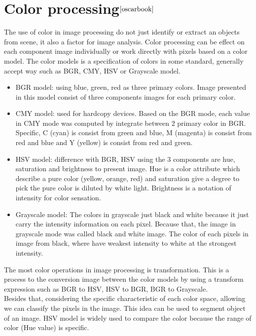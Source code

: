 \section{Color processing$^{\cite{oscarbook}}$}\label{color_model}
The use of color in image processing do not just identify or extract an objects from scene, it also a factor for image analysis. Color processing can be effect on each component image individually or work directly with pixels based on a color model. The color models is a specification of colors in some standard, generally accept way such as BGR, CMY, HSV or Grayscale model.
\begin{itemize}
\item BGR model: using blue, green, red as three primary colors. Image presented in this model consist of three components images for each primary color.
\item CMY model: used for hardcopy devices. Based on the BGR mode, each value in CMY mode was computed by integrate between 2 primary color in BGR. Specific, C (cyan) is consist from green and blue, M (magenta) is consist from red and blue and Y (yellow) is consist from red and green.
\item HSV model: difference with BGR, HSV using the 3 components are hue, saturation and brightness to present image. Hue is a color attribute which describe a pure color (yellow, orange, red) and saturation give a degree to pick the pure color is diluted by white light. Brightness is a notation of intensity for color sensation.
\item Grayscale model: The colors in grayscale just black and white because it just carry the intensity information on each pixel. Because that, the image in grayscale mode was called black and white image. The color of each pixels in image from black, where have weakest intensity to white at the strongest intensity.
\end{itemize}
The most color operations in image processing is transformation. This is a process to the conversion image between the color models by using a transform expression such as BGR to HSV, HSV to BGR, BGR to Grayscale.\\[0.2cm]
Besides that, considering the specific characteristic of each color space, allowing we can classify the pixels in the image. This idea can be used to segment object of an image. HSV model is widely used to compare the color because the range of color (Hue value) is specific.
